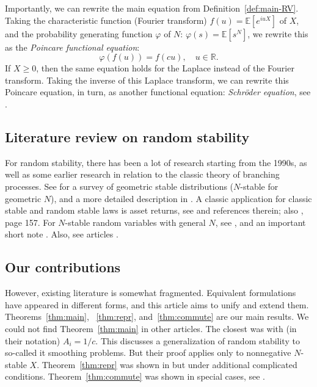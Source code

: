 \documentclass[12pt]{amsart}
\theoremstyle{remark}
\theoremstyle{definition}
\begin{document}
Importantly, we can rewrite the main equation from Definition~\ref{def:main-RV}. Taking the characteristic function (Fourier transform) $f(u) = \mathbb E[e^{iuX}]$ of $X$, and the probability generating function $\varphi$ of $N$: $\varphi(s) = \mathbb E[s^N]$, we rewrite this as the {\it Poincare functional equation}:
\begin{equation}
\label{eq:main-ChF}
\varphi(f(u)) = f(cu),\quad u \in \mathbb R.
\end{equation}
If $X \ge 0$, then the same equation holds for the Laplace instead of the Fourier transform. Taking the inverse of this Laplace transform, we can rewrite this Poincare equation, in turn, as another functional equation: {\it Schr\"oder equation}, see \cite{Kuczma}. 

\subsection{Literature review on random stability} For random stability, there has been a lot of research starting from the 1990s, as well as some earlier research in relation to the classic theory of branching processes. See \cite{Koz1} for a survey of geometric stable distributions ($N$-stable for geometric $N$), and a more detailed description in \cite[Chapter 9]{KKRbook}. A classic application for classic stable and random stable laws is asset returns, see \cite[Remark 2.2]{Koz1} and references therein; also \cite[Chapter 4]{KlebanovBook}, page 157. For $N$-stable random variables with general $N$, see \cite[Chapter 4]{KlebanovBook}, and an important short note \cite{Anna}. Also, see  articles \cite{Stable, Zolotarev}.

\subsection{Our contributions} However, existing literature is somewhat fragmented. Equivalent formulations have appeared in different forms, and this article aims to unify and extend them. Theorems~\ref{thm:main}, ~\ref{thm:repr}, and~\ref{thm:commute} are our main results. We could not find Theorem~\ref{thm:main} in other articles. The closest was \cite[Corollary 1.2]{Liu1998} with (in their notation) $A_i = 1/c$. This discusses a generalization of random stability to so-called {it smoothing problems}. But their proof applies only to nonnegative $N$-stable $X$. Theorem~\ref{thm:repr} was shown in \cite{Anna} but under additional complicated conditions.  Theorem~\ref{thm:commute} was shown in special cases, see \cite{GnedenkoBook}. 
\end{document}
